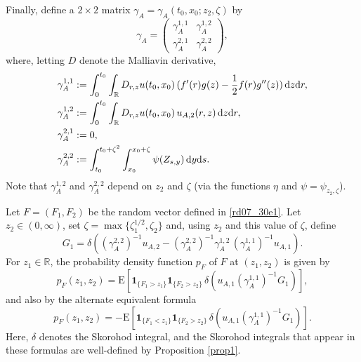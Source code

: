 \documentclass[12pt,a4paper]{article}
\newcommand{\bD}{{\mathbb{D}}}
\newcommand{\R}{{\mathbb{R}}}
\newcommand{\E}{\mathrm{E}}
\newcommand{\HH}{\mathcal{H}}
\renewcommand{\d}{\mathrm{d}}
\newcommand {\deltah}{{\zeta}}
\newcommand{\<}{\langle}
\renewcommand{\>}{\rangle}
\begin{document}
 Finally, define a $2 \times 2$ matrix $ \gamma_A = \gamma_A(t_0,x_0; z_2, \deltah)$ by
 \[
 \gamma_A = \left(\begin{array}{cc} 
         \gamma_{A} ^{1,1} & \gamma_{A} ^{1,2} \\ [7pt]
         \gamma_{A} ^{2,1} & \gamma_{A} ^{2,2}\end{array} \right),
 \]
 where, letting $D$ denote the Malliavin derivative,
 \begin{align}\notag
 \gamma_{A} ^{1,1} &:= \int_0^{t_0}\int_\R D_{r,z} u(t_0,x_0)\,  ( f'(r) g(z)- \frac 12f(r) g''(z) )\, \d z \d r, \\
  \gamma_{A} ^{1,2} &:=  \int_0^{t_0}\int_\R   D_{r,z} u(t_0,x_0)\, u_{A,2}(r,z)\, \d z \d r,  \notag \\
   \gamma^{2,1}_A &:= 0, \notag \\
 \gamma^{2,2}_A &:= \int_{t_0}^{t_0+\deltah^2}\int_{x_0}^{x_0+\deltah}\psi(Z_{s,y})\, \d y\d s.
 \label{rd08_04e1}
 \end{align}
 Note that $ \gamma_{A} ^{1,2}$ and $ \gamma_{A} ^{2,2}$ depend on $z_2$  and $\deltah$ (via the functions $\eta$ and $\psi = \psi_{z_2, \deltah}$).
  
   \begin{proposition}\label{rd04_04p1}
  Let $F = (F_1, F_2)$ be the random vector defined in \eqref{rd07_30e1}. Let $z_2 \in (0, \infty)$, set $\zeta=\max\{\zeta_1^{1/2}, \zeta_2\}$ and, using $z_2$ and this value of $\zeta$, define
  \[
     G_1=\delta\left (  (\gamma_{A} ^{2,2})^{-1} u_{A,2}   - (\gamma_{A} ^{2,2})^{-1}   \gamma_{A} ^{1,2}\,
       ( \gamma_{A} ^{1,1})^{-1}u_{A,1} \right).
  \]
For $z_1 \in \R$, the probability density function $p_F$ of $F$ at $(z_1, z_2)$ is given by
  \begin{equation} \label{for9}
    p_F(z_1,z_2)= \E \left[ \mathbf{1}_{\{F_1>z_1\}} \mathbf{1}_{\{F_2>z_2\}}\, \delta( u_{A,1}
  (\gamma_A^{1,1})^{-1}   G_1) \right],
 \end{equation}
  and also by the alternate equivalent formula 
 \begin{equation} \label{for10}
      p_F(z_1,z_2)= -\E \left[ \mathbf{1}_{\{F_1<z_1\}} \mathbf{1}_{\{F_2>z_2\}} \, \delta( u_{A,1}
  (\gamma_A^{1,1})^{-1}   G_1)\right].
 \end{equation}
Here, $\delta$ denotes the Skorohod integral, and the Skorohod integrals that appear in these formulas are well-defined by Proposition \ref{prop1}.
\end{proposition}
\end{document}
